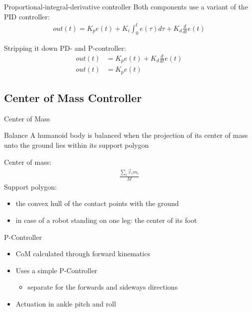 \documentclass{beamer}
\begin{document}
\begin{frame}{Proportional-integral-derivative controller}
  Both components use a variant of the PID controller:
  \begin{align*}
    out(t) = K_p e(t) + K_i \int_{0}^{t} e(\tau) d\tau + K_d \frac{d}{dt} e(t)
  \end{align*}
\end{frame}

\begin{frame}{Stripping it down}
  PD- and P-controller:
  \begin{align*}
    out(t) &= K_p e(t) + K_d \frac{d}{dt} e(t) \\
    out(t) &= K_p e(t)
  \end{align*}
\end{frame}

\subsection{Center of Mass Controller}
\begin{frame}{Center of Mass}
  \begin{block}{Balance}
    A humanoid body is balanced when the projection of its center of
mass unto the ground lies within its support polygon
  \end{block}
  Center of mass:
  \begin{align*}
    \frac{\sum_i \vec{c}_i m_i}{M}
  \end{align*}
  Support polygon:
  \begin{itemize}
    \item the convex hull of the contact points with the ground
    \item in case of a robot standing on one leg: the center of its foot
  \end{itemize}
\end{frame}

\begin{frame}{P-Controller}
  \begin{itemize}
    \item CoM calculated through forward kinematics
    \item Uses a simple P-Controller
    \begin{itemize}
      \item separate for the forwards and sideways directions
    \end{itemize}
    \item Actuation in ankle pitch and roll
  \end{itemize}
\end{frame}
\end{document}
